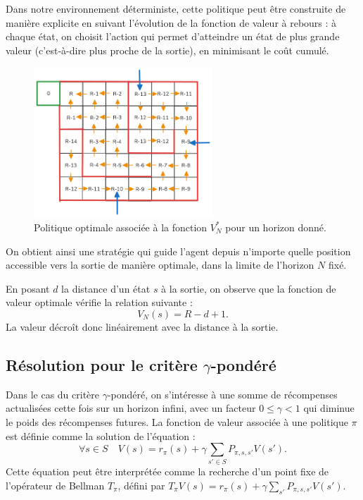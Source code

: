 \documentclass[12pt]{article}
\begin{document}
Dans notre environnement déterministe, cette politique peut être construite de manière explicite en suivant l’évolution de la fonction de valeur à rebours : à chaque état, on choisit l’action qui permet d’atteindre un état de plus grande valeur (c’est-à-dire plus proche de la sortie), en minimisant le coût cumulé.

\vspace{1em}
\begin{figure}[H]
    \centering
    \includegraphics[width=0.6\textwidth]{politiquelab.png}
    \caption{Politique optimale associée à la fonction \(V_N^*\) pour un horizon donné.}
    \label{fig:policyN}
\end{figure}

On obtient ainsi une stratégie qui guide l’agent depuis n’importe quelle position accessible vers la sortie de manière optimale, dans la limite de l’horizon \(N\) fixé.


En posant \(d\) la distance d’un état \(s\) à la sortie, on observe que la fonction de valeur optimale vérifie la relation suivante :
\[
V_N(s) = R - d + 1.
\]
La valeur décroît donc linéairement avec la distance à la sortie.

\subsection{Résolution pour le critère $\gamma$-pondéré}

Dans le cas du critère $\gamma$-pondéré, on s'intéresse à une somme de récompenses actualisées cette fois sur un horizon infini, avec un facteur $0 \leq \gamma < 1$ qui diminue le poids des récompenses futures. La fonction de valeur associée à une politique $\pi$ est définie comme la solution de l'équation :
\[
\forall s \in S \quad V(s) = r_\pi(s) + \gamma \sum_{s' \in S} P_{\pi, s, s'} V(s').
\]
Cette équation peut être interprétée comme la recherche d’un point fixe de l’opérateur de Bellman $T_\pi$, défini par $T_\pi V(s) = r_\pi(s) + \gamma \sum_{s'} P_{\pi, s, s'} V(s')$.
\end{document}
